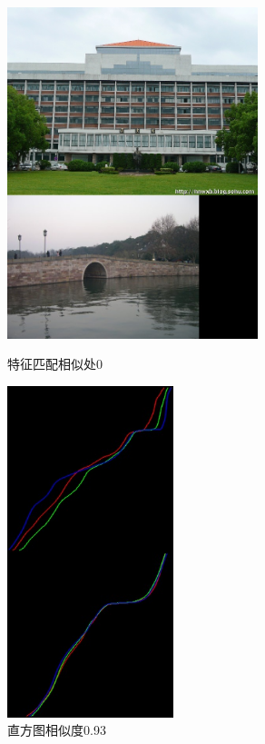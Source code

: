 \begin{figure}[htb]
\begin{minipage}[t]{0.5\linewidth}
\centering
\includegraphics[height=3.8in]{玉泉图书馆.jpg.d/im5sift.jpg}
\caption{特征匹配相似处0}
\label{fig:side:a}
\end{minipage}%
\begin{minipage}[t]{0.5\linewidth}
\centering
\includegraphics[height=3.8in]{玉泉图书馆.jpg.d/im5hist2.jpg}
\caption{直方图相似度0.93}
\label{fig:side:a}
\end{minipage}%
\end{figure}

\clearpage
